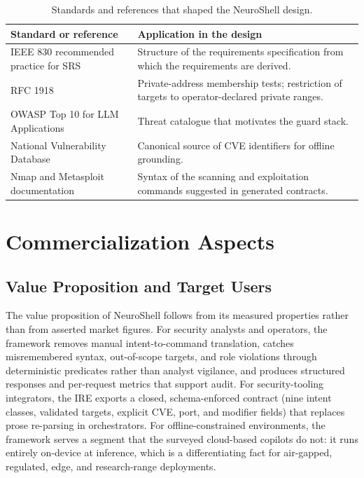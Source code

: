 \begin{table}[htbp]
  \centering
  \begin{tabular}{@{}p{}p{}@{}}
    \toprule
    \textbf{Standard or reference} & \textbf{Application in the design}\\
    \midrule
    IEEE 830 recommended practice for SRS & Structure of the requirements specification from which the requirements are derived.\\
    RFC 1918 & Private-address membership tests; restriction of targets to operator-declared private ranges.\\
    OWASP Top 10 for LLM Applications & Threat catalogue that motivates the guard stack.\\
    National Vulnerability Database & Canonical source of CVE identifiers for offline grounding.\\
    Nmap and Metasploit documentation & Syntax of the scanning and exploitation commands suggested in generated contracts.\\
    \bottomrule
  \end{tabular}
  \caption{Standards and references that shaped the NeuroShell design.}\label{tab:standards}
\end{table}

\section{Commercialization Aspects}\label{sec:commercial}

\subsection{Value Proposition and Target Users}\label{sec:commercial-value}

The value proposition of NeuroShell follows from its measured properties rather
than from asserted market figures. For security analysts and operators, the
framework removes manual intent-to-command translation, catches misremembered
syntax, out-of-scope targets, and role violations through deterministic
predicates rather than analyst vigilance, and produces structured responses and
per-request metrics that support audit. For security-tooling integrators, the
IRE exports a closed, schema-enforced contract (nine intent classes, validated
targets, explicit CVE, port, and modifier fields) that replaces prose
re-parsing in orchestrators. For offline-constrained environments, the
framework serves a segment that the surveyed cloud-based copilots do not: it
runs entirely on-device at inference, which is a differentiating fact for
air-gapped, regulated, edge, and research-range deployments.

